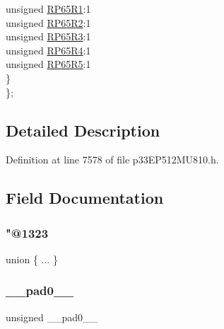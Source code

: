 \begin{DoxyCompactItemize}
\begin{tabbing}
\>\>unsigned \hyperlink{structtag_r_p_o_r0_b_i_t_s_a047f577cbcd2134793842be240de42f6}{RP65R1}:1\\
\>\>unsigned \hyperlink{structtag_r_p_o_r0_b_i_t_s_a8cbd1ebbb4160062d792609e472083f3}{RP65R2}:1\\
\>\>unsigned \hyperlink{structtag_r_p_o_r0_b_i_t_s_a7c00a440bb71b1b9d66a20cb797a1082}{RP65R3}:1\\
\>\>unsigned \hyperlink{structtag_r_p_o_r0_b_i_t_s_aca01132661ce2b0aefe4975e2084376f}{RP65R4}:1\\
\>\>unsigned \hyperlink{structtag_r_p_o_r0_b_i_t_s_ad52150a6d20d36a5d2a3e63ccadd3932}{RP65R5}:1\\
\>\} \\
\}; \\

\end{tabbing}\end{DoxyCompactItemize}


\subsection{Detailed Description}


Definition at line 7578 of file p33\+E\+P512\+M\+U810.\+h.



\subsection{Field Documentation}
\mbox{\label{structtag_r_p_o_r0_b_i_t_s_a6e55ab8f3755593b239958eac41648ca}} 
\subsubsection{\texorpdfstring{"@1323}{@1323}}
{\footnotesize\ttfamily union \{ ... \} }

\mbox{\label{structtag_r_p_o_r0_b_i_t_s_adf71f3d8410c1f1dbbc96680a92c49af}} 
\subsubsection{\texorpdfstring{\+\_\+\+\_\+pad0\+\_\+\+\_\+}{\_\_pad0\_\_}}
{\footnotesize\ttfamily unsigned \+\_\+\+\_\+pad0\+\_\+\+\_\+}



